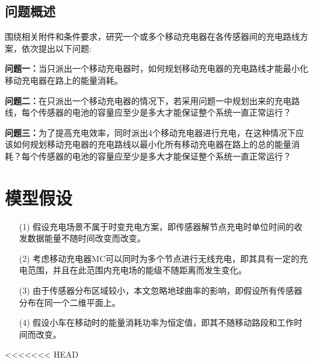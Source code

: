 \documentclass{whutmod}
\begin{document}
		\subsection{问题概述}
		    围绕相关附件和条件要求，研究一个或多个移动充电器在各传感器间的充电路线方案，依次提出以下问题:
				 
			
			\textbf{问题一：}当只派出一个移动充电器时，如何规划移动充电器的充电路线才能最小化移动充电器在路上的能量消耗。
			
			\textbf{问题二：}在只派出一个移动充电器的情况下，若采用问题一中规划出来的充电路线，每个传感器的电池的容量应至少是多大才能保证整个系统一直正常运行？
			
			\textbf{问题三：}为了提高充电效率，同时派出4个移动充电器进行充电，在这种情况下应该如何规划移动充电器的充电路线以最小化所有移动充电器在路上的总的能量消耗？每个传感器的电池的容量应至少是多大才能保证整个系统一直正常运行？

	
	\section{模型假设}

		\begin{itemize}  
		\item [(1)] 假设充电场景不属于时变充电方案，即传感器解节点充电时单位时间的收发数据能量不随时间改变而改变。
		\item [(2)] 考虑移动充电器MC可以同时为多个节点进行无线充电，即其具有一定的充电范围，并且在此范围内充电场的能级不随距离而发生变化。                 
		\item [(3)] 由于传感器分布区域较小，本文忽略地球曲率的影响，即假设所有传感器分布在同一个二维平面上。
		\item [(4)] 假设小车在移动时的能量消耗功率为恒定值，即其不随移动路段和工作时间而改变。

		\end{itemize}

		
<<<<<<< HEAD
\end{document}

